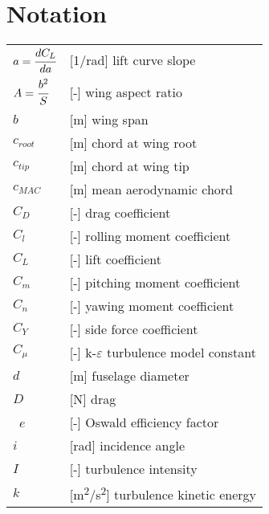 \clearpage %
{}
\chapter*{Notation}
\markright{}

\begin{longtable}[l]{ l p{} }
  $a=\cfrac{dC_L}{da}$                         & [1/rad] lift curve slope \\
  $A=\cfrac{b^2}{S}$                           & [-] wing aspect ratio \\
  $b$                                          & [m] wing span \\
  $c_{root}$                                   & [m] chord at wing root \\
  $c_{tip}$                                    & [m] chord at wing tip \\
  $c_{MAC}$                                    & [m] mean aerodynamic chord \\
  $C_D$                                        & [-] drag coefficient \\
  $C_l$                                        & [-] rolling moment coefficient \\
  $C_L$                                        & [-] lift coefficient \\
  $C_m$                                        & [-] pitching moment coefficient \\
  $C_n$                                        & [-] yawing moment coefficient \\
  $C_Y$                                        & [-] side force coefficient \\
  $C_{\mu}$                                    & [-] k-$\varepsilon$ turbulence model constant \\
  $d$                                          & [m] fuselage diameter \\
  $D$                                          & [N] drag \\\
  $e$                                          & [-] Oswald efficiency factor \\
  $i$                                          & [rad] incidence angle \\
  $I$                                          & [-] turbulence intensity \\
  $k$                                          & [m\textsuperscript{2}/s\textsuperscript{2}] turbulence kinetic energy \\

\end{longtable}
